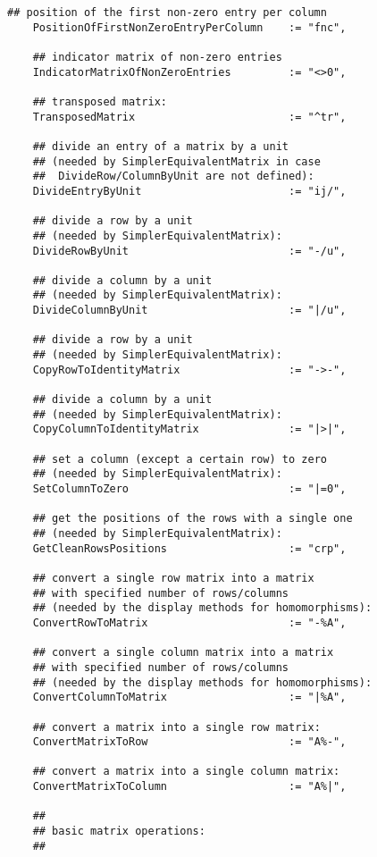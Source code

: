 \documentclass[a4paper,11pt]{report}
\begin{document}
{{{\begin{Verbatim}[fontsize=\small,frame=single,label=Code]
    ## position of the first non-zero entry per column
    PositionOfFirstNonZeroEntryPerColumn    := "fnc",
    
    ## indicator matrix of non-zero entries
    IndicatorMatrixOfNonZeroEntries         := "<>0",
    
    ## transposed matrix:
    TransposedMatrix                        := "^tr",
    
    ## divide an entry of a matrix by a unit
    ## (needed by SimplerEquivalentMatrix in case
    ##  DivideRow/ColumnByUnit are not defined):
    DivideEntryByUnit                       := "ij/",
    
    ## divide a row by a unit
    ## (needed by SimplerEquivalentMatrix):
    DivideRowByUnit                         := "-/u",
    
    ## divide a column by a unit
    ## (needed by SimplerEquivalentMatrix):
    DivideColumnByUnit                      := "|/u",
    
    ## divide a row by a unit
    ## (needed by SimplerEquivalentMatrix):
    CopyRowToIdentityMatrix                 := "->-",
    
    ## divide a column by a unit
    ## (needed by SimplerEquivalentMatrix):
    CopyColumnToIdentityMatrix              := "|>|",
    
    ## set a column (except a certain row) to zero
    ## (needed by SimplerEquivalentMatrix):
    SetColumnToZero                         := "|=0",
    
    ## get the positions of the rows with a single one
    ## (needed by SimplerEquivalentMatrix):
    GetCleanRowsPositions                   := "crp",
    
    ## convert a single row matrix into a matrix
    ## with specified number of rows/columns
    ## (needed by the display methods for homomorphisms):
    ConvertRowToMatrix                      := "-%A",
    
    ## convert a single column matrix into a matrix
    ## with specified number of rows/columns
    ## (needed by the display methods for homomorphisms):
    ConvertColumnToMatrix                   := "|%A",
    
    ## convert a matrix into a single row matrix:
    ConvertMatrixToRow                      := "A%-",
    
    ## convert a matrix into a single column matrix:
    ConvertMatrixToColumn                   := "A%|",
    
    ##
    ## basic matrix operations:
    ##
    

\end{Verbatim}}}}
\end{document}
